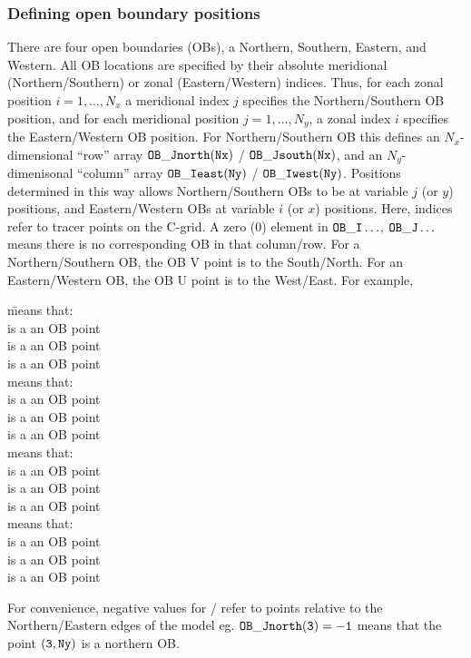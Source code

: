 
\subsubsection{Defining open boundary positions
\label{sec:pkg:obcs:defining}}

There are four open boundaries (OBs), a 
Northern, Southern, Eastern, and Western.
All OB locations are specified by their absolute
meridional (Northern/Southern) or zonal (Eastern/Western) indices.
Thus, for each zonal position $i=1,\ldots,N_x$ a meridional index
$j$ specifies the Northern/Southern OB position,
and for each meridional position $j=1,\ldots,N_y$, a zonal index
$i$ specifies the Eastern/Western OB position.
For Northern/Southern OB this defines an $N_x$-dimensional
``row'' array $\tt OB\_Jnorth(Nx)$ / $\tt OB\_Jsouth(Nx)$,
and an $N_y$-dimenisonal 
``column'' array $\tt OB\_Ieast(Ny)$ / $\tt OB\_Iwest(Ny)$.
Positions determined in this way allows Northern/Southern
OBs to be at variable $j$ (or $y$) positions, and Eastern/Western
OBs at variable $i$ (or $x$) positions.
Here, indices refer to tracer points on the C-grid.
A zero (0) element in $\tt OB\_I\ldots$, $\tt OB\_J\ldots$
means there is no corresponding OB in that column/row.
For a Northern/Southern OB, the OB V point is to the South/North.
For an Eastern/Western OB, the OB U point is to the West/East.
For example,
\begin{tabbing}
   \=  means that:  \= \\
  \>  \> is a an OB point  \\
  \>  \> is a an OB point \\
  \>  \> is a an OB point \\
   \> means that: \\
  \>  \> is a an OB point \\
  \>  \> is a an OB point \\ 
  \>  \> is a an OB point \\
   \>  means that:  \>  \\
  \>  \> is a an OB point \\
  \>  \> is a an OB point \\
  \>  \> is a an OB point \\
   \>  means that:  \>  \\
  \>  \> is a an OB point \\
  \>  \> is a an OB point \\
  \>  \> is a an OB point
\end{tabbing}
For convenience, negative values for / refer to
points relative to the Northern/Eastern edges of the model
eg. $\tt OB\_Jnorth(3)=-1$  means that the point $\tt (3,Ny)$ 
is a northern OB.

